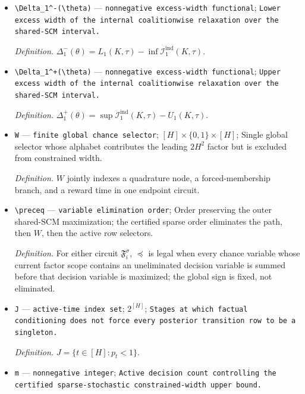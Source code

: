 \documentclass{article}
\begin{document}
\begin{itemize}
  \item \texttt{\textbackslash{}\allowbreak{}Delta\_\allowbreak{}1\textasciicircum{}-\allowbreak{}(\textbackslash{}\allowbreak{}theta)} --- \texttt{nonnegative excess-\allowbreak{}width functional}; \texttt{Lower excess width of the internal coalitionwise relaxation over the shared-\allowbreak{}SCM interval.}
  \par\smallskip\noindent\emph{Definition.} \(\Delta_1^-(\theta)=L_1(K,\tau)-\inf\mathcal I_1^{\mathrm{ind}}(K,\tau)\).
  \item \texttt{\textbackslash{}\allowbreak{}Delta\_\allowbreak{}1\textasciicircum{}+\allowbreak{}(\textbackslash{}\allowbreak{}theta)} --- \texttt{nonnegative excess-\allowbreak{}width functional}; \texttt{Upper excess width of the internal coalitionwise relaxation over the shared-\allowbreak{}SCM interval.}
  \par\smallskip\noindent\emph{Definition.} \(\Delta_1^+(\theta)=\sup\mathcal I_1^{\mathrm{ind}}(K,\tau)-U_1(K,\tau)\).
  \item \texttt{W} --- \texttt{finite global chance selector}; \([H]\times\{0,1\}\times[H]\); Single global selector whose alphabet contributes the leading \(2H^2\) factor but is excluded from constrained width.
  \par\smallskip\noindent\emph{Definition.} \(W\) jointly indexes a quadrature node, a forced-membership branch, and a reward time in one endpoint circuit.
  \item \texttt{\textbackslash{}\allowbreak{}preceq} --- \texttt{variable elimination order}; Order preserving the outer shared-SCM maximization; the certified sparse order eliminates the path, then \(W\), then the active row selectors.
  \par\smallskip\noindent\emph{Definition.} For either circuit \(\mathfrak F_i^{\sigma}\), \(\preceq\) is legal when every chance variable whose current factor scope contains an uneliminated decision variable is summed before that decision variable is maximized; the global sign is fixed, not eliminated.
  \item \texttt{J} --- \texttt{active-\allowbreak{}time index set}; \(2^{[H]}\); \texttt{Stages at which factual conditioning does not force every posterior transition row to be a singleton.}
  \par\smallskip\noindent\emph{Definition.} \(J=\{t\in[H]:p_t<1\}\).
  \item \texttt{m} --- \texttt{nonnegative integer}; \texttt{Active decision count controlling the certified sparse-\allowbreak{}stochastic constrained-\allowbreak{}width upper bound.}

\end{itemize}
\end{document}
